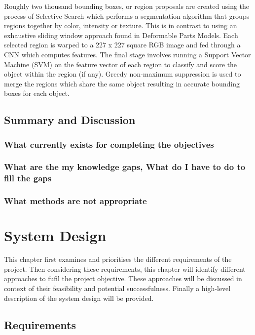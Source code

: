 \documentclass{mproj}
\begin{document}
Roughly two thousand bounding boxes, or region proposals are created using the process of Selective Search which performs a segmentation algorithm that groups regions together by color, intensity or texture.\cite{Sande2013} This is in contrast to using an exhaustive sliding window approach found in Deformable Parts Models.\cite{voc-release4} Each selected region is warped to a 227 x 227 square RGB image and fed through a CNN which computes features. The final stage involves running a Support Vector Machine (SVM) on the feature vector of each region to classify and score the object within the region (if any). Greedy non-maximum suppression is used to merge the regions which share the same object resulting in accurate bounding boxes for each object. 


\section{Summary and Discussion}
\subsection{What currently exists for completing the objectives}
\subsection{What are the my knowledge gaps, What do I have to do to fill the gaps}
\subsection{What methods are not appropriate}

\chapter{System Design}

This chapter first examines and prioritises the different requirements of the project. Then considering these requirements, this chapter will identify different approaches to fufil the project objective. These approaches will be discussed in context of their feasibility and potential successfulness. Finally a high-level description of the system design will be provided. 

\section{Requirements}
 
\end{document}
